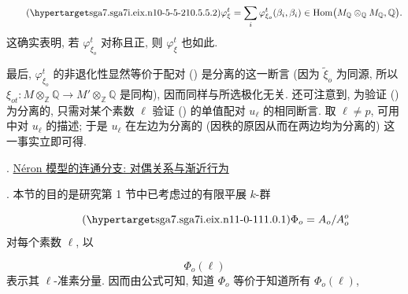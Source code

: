 \begin{equation}\tag{\SGARefTarget{sga7.sga7i.eix.n10-5-5-2}{10.5.5.2}}
\varphi^t_\xi
 =\sum_i\varphi^t_{\xi_o}(\beta_i,\beta_i)
 \in\operatorname{Hom}
 \bigl(M_{\mathbb Q}\otimes_{\mathbb Q}M_{\mathbb Q},\mathbb Q\bigr).
\end{equation}
这确实表明, 若 $\varphi^t_{\xi_o}$ 对称且正, 则 $\varphi^t_\xi$ 也如此.

最后, $\varphi^t_{\xi_o}$ 的非退化性显然等价于配对 () 是分离的这一断言 (因为 $\widetilde\xi_o$ 为同源, 所以 $\xi_{ot}:M\otimes_{\mathbb Z}\mathbb Q
\longrightarrow M'\otimes_{\mathbb Z}\mathbb Q$ 是同构), 因而同样与所选极化无关. 还可注意到, 为验证 () 为分离的, 只需对某个素数 $\ell$ 验证 () 的单值配对 $u_\ell$ 的相同断言. 取 $\ell\ne p$, 可用  中对 $u_\ell$ 的描述; 于是 $u_\ell$ 在左边为分离的 (因秩的原因从而在两边均为分离的) 这一事实立即可得.



\medskip
{}. \underline{N\'eron 模型的连通分支: 对偶关系与渐近行为}

\smallskip
\noindent
{}. 本节的目的是研究第 1 节中已考虑过的有限平展 $k$-群

\begin{equation}\tag{\SGARefTarget{sga7.sga7i.eix.n11-0-1}{11.0.1}}
\Phi_o=A_o/A_o^{o}
\end{equation}
对每个素数 $\ell$, 以

\begin{equation*}
\Phi_o(\ell)
\end{equation*}
表示其 $\ell$-准素分量. 因而由公式可知, 知道 $\Phi_o$ 等价于知道所有 $\Phi_o(\ell)$,

